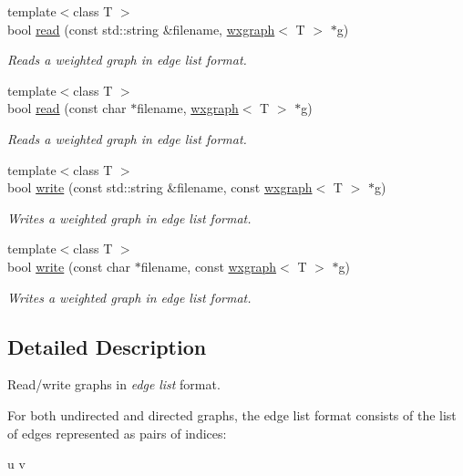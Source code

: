 \begin{DoxyCompactItemize}
{\footnotesize template$<$class T $>$ }\\bool \hyperlink{namespacelgraph_1_1io_1_1edge__list_ab421e520957c993c352796a839e38173}{read} (const std\+::string \&filename, \hyperlink{classlgraph_1_1wxgraph}{wxgraph}$<$ T $>$ $\ast$g)
\begin{DoxyCompactList}\small\item\em Reads a weighted graph in edge list format. \end{DoxyCompactList}\item 
{\footnotesize template$<$class T $>$ }\\bool \hyperlink{namespacelgraph_1_1io_1_1edge__list_af10b33e98f0f7df9dd555006a69ad0de}{read} (const char $\ast$filename, \hyperlink{classlgraph_1_1wxgraph}{wxgraph}$<$ T $>$ $\ast$g)
\begin{DoxyCompactList}\small\item\em Reads a weighted graph in edge list format. \end{DoxyCompactList}\item 
{\footnotesize template$<$class T $>$ }\\bool \hyperlink{namespacelgraph_1_1io_1_1edge__list_ae422e4d5062831a958585527065208e7}{write} (const std\+::string \&filename, const \hyperlink{classlgraph_1_1wxgraph}{wxgraph}$<$ T $>$ $\ast$g)
\begin{DoxyCompactList}\small\item\em Writes a weighted graph in edge list format. \end{DoxyCompactList}\item 
{\footnotesize template$<$class T $>$ }\\bool \hyperlink{namespacelgraph_1_1io_1_1edge__list_ab8a0f64a5850e4c9741fcb2fc53646b7}{write} (const char $\ast$filename, const \hyperlink{classlgraph_1_1wxgraph}{wxgraph}$<$ T $>$ $\ast$g)
\begin{DoxyCompactList}\small\item\em Writes a weighted graph in edge list format. \end{DoxyCompactList}\end{DoxyCompactItemize}


\subsection{Detailed Description}
Read/write graphs in {\itshape edge} {\itshape list} format. 

For both undirected and directed graphs, the edge list format consists of the list of edges represented as pairs of indices\+: \begin{DoxyVerb}u v
\end{DoxyVerb}


